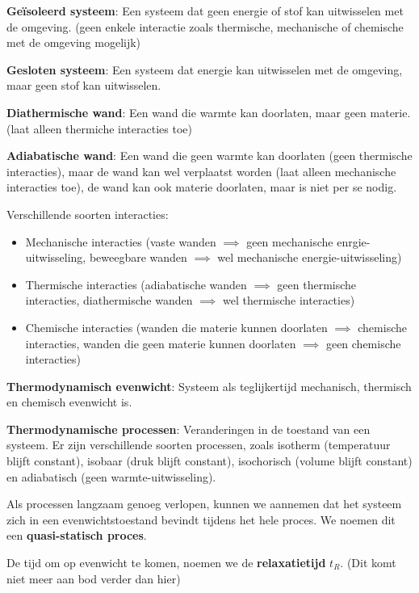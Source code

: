 \begin{definition}
    \textbf{Geïsoleerd systeem}: Een systeem dat geen energie of stof kan uitwisselen met de omgeving. (geen enkele interactie zoals thermische, mechanische of chemische met de omgeving mogelijk)
\end{definition}

\begin{definition}
    \textbf{Gesloten systeem}: Een systeem dat energie kan uitwisselen met de omgeving, maar geen stof kan uitwisselen.
\end{definition}

\begin{definition}
    \textbf{Diathermische wand}: Een wand die warmte kan doorlaten, maar geen materie. (laat alleen thermiche interacties toe)
\end{definition}

\begin{definition}
    \textbf{Adiabatische wand}: Een wand die geen warmte kan doorlaten (geen thermische interacties), maar de wand kan wel verplaatst worden (laat alleen mechanische interacties toe), de wand kan ook materie doorlaten, maar is niet per se nodig.
\end{definition}

Verschillende soorten interacties:
\begin{itemize}
    \item Mechanische interacties (vaste wanden \(\implies\) geen mechanische enrgie-uitwisseling, beweegbare wanden \(\implies\) wel mechanische energie-uitwisseling)
    \item Thermische interacties (adiabatische wanden \(\implies\) geen thermische interacties, diathermische wanden \(\implies\) wel thermische interacties)
    \item Chemische interacties (wanden die materie kunnen doorlaten \(\implies\) chemische interacties, wanden die geen materie kunnen doorlaten \(\implies\) geen chemische interacties)
\end{itemize}

\begin{definition}
    \textbf{Thermodynamisch evenwicht}: Systeem  als teglijkertijd mechanisch, thermisch en chemisch evenwicht is.
\end{definition}

\begin{definition}
  \textbf{Thermodynamische processen}: Veranderingen in de toestand van een systeem. Er zijn verschillende soorten processen, zoals isotherm (temperatuur blijft constant), isobaar (druk blijft constant), isochorisch (volume blijft constant) en adiabatisch (geen warmte-uitwisseling).
\end{definition}

Als processen langzaam genoeg verlopen, kunnen we aannemen dat het systeem zich in een evenwichtstoestand bevindt tijdens het hele proces. We noemen dit een \textbf{quasi-statisch proces}.

De tijd om op evenwicht te komen, noemen we de \textbf{relaxatietijd} \(t_R\). (Dit komt niet meer aan bod verder dan hier)
